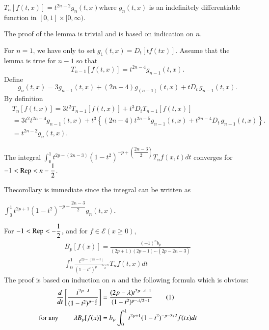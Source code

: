 \begin{lem}\label{part1:chap3:sec2:lem1}%
  $T_n [ f (t, x )] = t^{ 2n - 2} g_n (t, x)$\pageoriginale where $g_n (t, x )$ is
  an indefinitely differentiable function in $[ 0, 1] \times [ 0,
    \infty ) $.  
\end{lem}

The proof of the lemma is trivial and is based on indication on $n$. 

For $n = 1$, we have only to set $g_1 (t, x ) = D_t[ tf (tx)]
$. Assume that the lemma is true for $n-1$ so that  
$$
T_{ n -1} [ f (t, x)] = t^{ 2n - 4} g_{ n - 1} (t, x ). 
$$
Define 
$$
g_n (t, x ) = 3g _{ n-1} (t, x) + (2n - 4) g_{(n -1)} (t, x) + t D_t
\, g_{ n - 1} (t, x).  
$$
By definition 
\begin{align*}
  & T_n  [ f (t, x) ] = 3 t^2 T_{ n -1} [ f (t, x)]  + t^3 D_t T_{ n
    -1} [ f (t, x)] \\ 
  & = 3t^2 t^{ 2n - 4} g_{ n - 1} (t, x ) + t^3 \left \{ (2n - 4) t
  ^{2n -5} g_{ n -1} (t, x) + t^{ 2n - 4 }D_t\, g_{ n-1} (t, x)\right
  \}.\\ 
  & = t^{ 2n - 2} g_n (t, x). 
\end{align*}

\begin{coro*}
  The integral $\int^1_0 t^{2p - (2 n -3)} (1 - t^2)^{-p + \left(\dfrac{2n -
      3}{2}\right)} T_n f (x, t) dt $ converges for $- 1 < \operatorname{Rep}< n -
  \dfrac{1}{2}$.  
\end{coro*}

The\pageoriginale corollary is immediate since the integral can be written as

\noindent $\int^1 _0 t^{ 2 p +1} (1 - t^2)^{-p + \dfrac{2 n -3}{2}} g_n (t, x)$.  

\setcounter{proposition}{0}
\begin{proposition}\label{part1:chap3:sec2:prop1} %
  For $-1 < \operatorname{Rep}< - \dfrac{1}{2}$, and for $f \in \mathscr{E} (x \geq 0)$, 
  \begin{multline*}
  B_p [ f(x) ] = \frac{(-1)^n b_p}{(2 p + 1) (2 p - 1)\cdots (2 p -
    \overline{2n - 3})}\\
  \int^1_0 \frac{t^{2 p - (2n -3)}}{(1 - t^2)^{p -
      \frac{2 n -3}{2}}} T_n f (t, x) dt 
  \end{multline*}
  The proof is based on induction on $n$ and the following formula
  which is obvious:  
\begin{align*}
  \frac{d}{dt} \left [ \frac{t^{2 p - \lambda}}{(1 - t^2)^{p
        -\frac{\lambda}{2}}}\right] & =  \frac{(2 p - \lambda) t^{2 p
      - \lambda - 1}} 
       {(1 - t^2)^{p - \lambda / 2 + 1}}\tag{1}\label{part1:chap3:sec2:eq1}\\
       \text{\rm for any } \qquad \lambda B_p [ f(x) ] & = b_p \int^1
       _0 t^{ 2 p + 1} (1 - t^2)^{ - p -3/2} f (tx) dt\hspace{1cm}   
\end{align*}
\end{proposition}

